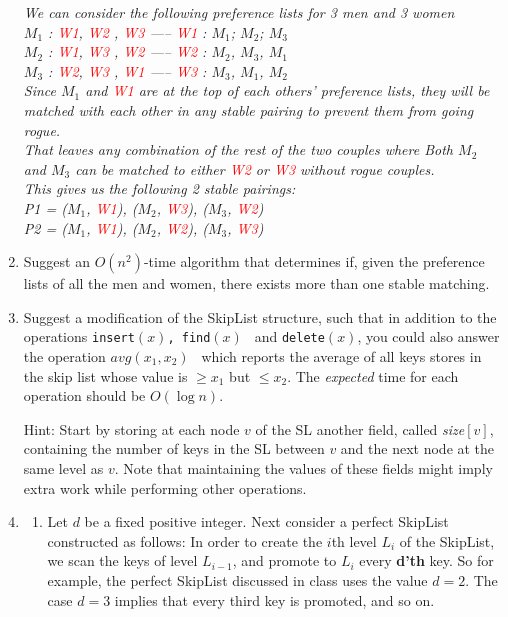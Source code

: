 \documentclass[11pt,epic,leqno,eepic,psfig,]{article}
\newcommand{\ans}[1]{{\color{brown}{\bf\Large Answer:} \sl  #1 \color{black}}}
\renewcommand{\i}{\item}
\begin{document}
\begin{enumerate}
\ans{We can consider the following preference lists for 3 men and 3 women
\\$M_1$ : \textcolor{red}{W1}, \textcolor{red}{W2} , \textcolor{red}{W3}  -----  \textcolor{red}{W1} : $M_1$; $M_2$; $M_3$
\\$M_2$ : \textcolor{red}{W1}, \textcolor{red}{W3} , \textcolor{red}{W2}  -----  \textcolor{red}{W2}  : $M_2$, $M_3$, $M_1$
\\$M_3$ : \textcolor{red}{W2}, \textcolor{red}{W3} , \textcolor{red}{W1}  -----  \textcolor{red}{W3}  : $M_3$, $M_1$, $M_2$
\\Since $M_1$ and  \textcolor{red}{W1}  are at the top of each others' preference lists, they will be matched with each other in any stable pairing to prevent them from going rogue.
\\That leaves any combination of the rest of the two couples where Both $M_2$ and $M_3$ can be matched to either \textcolor{red}{W2} or \textcolor{red}{W3} without rogue couples.
\\ This gives us the following 2 stable pairings:
\\ P1 = ($M_1$, \textcolor{red}{W1}), ($M_2$, \textcolor{red}{W3}), ($M_3$, \textcolor{red}{W2})
\\ P2 = ($M_1$, \textcolor{red}{W1}), ($M_2$, \textcolor{red}{W2}), ($M_3$, \textcolor{red}{W3})}

 \i Suggest an $O(n^2)$-time algorithm that determines if, given the preference lists of all the men and women, there exists more than one stable matching.

  \i Suggest a modification of the SkipList structure, such that in addition to the operations
 { \tt insert$(x)$, find$(x)$ } and {\tt delete$(x)$}, you could also answer the operation {\tt $avg(x_1, x_2)$ } which reports the average of all keys stores in the skip list whose value is $\geq x_1$ but $\leq x_2$.
 The {\em expected}  time for each operation should be $O(\log n)$.


Hint: Start by  storing  at each node $v$ of the SL another field, called {\sl size}$[v]$, containing the number of keys in the SL between $v$ and the next node at the same level as $v$. Note that maintaining the values of these fields might imply extra work while performing other operations.




\i
\begin{enumerate}

\i  Let $d$ be a fixed positive integer.
Next consider a perfect SkipList constructed  as follows:  In order to create the $i$th level $L_i$ of the SkipList, we scan the  keys  of  level $L_{i-1}$, and promote to $L_i$ every {\bf d'th} key.
So for example, the perfect SkipList discussed in class uses the value $d=2$. The case   $d=3$ implies that every third key is promoted, and so on.
\begin{enumerate}


\end{enumerate}
\end{enumerate}
\end{enumerate}
\end{document}
